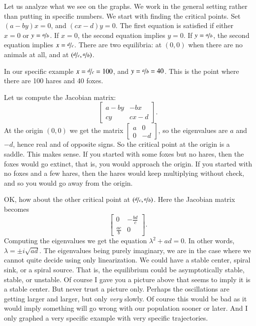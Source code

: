 \documentclass[12pt]{book}
\begin{document}
Let us analyze what we see on the graphs.  We work in the general
setting rather than putting in specific numbers.  We start with finding
the critical points.  Set $(a-by)x = 0$, and $(cx-d)y = 0$.
The first equation is satisfied if either $x=0$ or $y=\nicefrac{a}{b}$.  If $x=0$, the
second equation implies $y=0$.  If $y= \nicefrac{a}{b}$, the second equation implies
$x=\nicefrac{d}{c}$.
There are two equilibria: at $(0,0)$ when there are no animals at all, and at
$(\nicefrac{d}{c},\nicefrac{a}{b})$.  

In our specific example $x = \nicefrac{d}{c} = 100$, and $y = \nicefrac{a}{b} = 40$.
This is the point where there are 100 hares and 40 foxes.

Let us compute the Jacobian matrix:
\begin{equation*}
\begin{bmatrix}
a-by & -bx \\
cy & cx-d
\end{bmatrix} .
\end{equation*}
At the origin $(0,0)$ we get the matrix
$\left[ \begin{smallmatrix}
a & 0 \\
0 & -d
\end{smallmatrix} \right]$, so the eigenvalues are $a$ and $-d$, hence real
and of opposite signs.  So the critical point at the origin is a saddle.
This makes sense.  If you started with some foxes but no hares, then the
foxes would go extinct, that is, you would approach the origin.  If you
started with no foxes and a few hares, then the hares would keep multiplying
without check, and so you would go away from the origin.

OK, how about the other critical point at $(\nicefrac{d}{c},\nicefrac{a}{b})$.  Here
the Jacobian matrix becomes
\begin{equation*}
\begin{bmatrix}
0 & -\frac{bd}{c} \\
\frac{ac}{b} & 0
\end{bmatrix} .
\end{equation*}
Computing the eigenvalues we get the equation $\lambda^2 + ad = 0$.  In
other words, $\lambda = \pm i \sqrt{ad}$.  The eigenvalues being
purely imaginary, we are in the case where we cannot quite decide using only
linearization.  We could
have a stable center, spiral sink, or a spiral source.  That is, the
equilibrium could be asymptotically stable, stable, or unstable.  Of
course I gave you a picture above that seems to imply it is a stable
center.  But never trust a picture only.  Perhaps the oscillations
are getting larger and larger, but only \emph{very} slowly.  Of course this would be
bad as it would imply something will go wrong with our population
sooner or later.  And I only graphed a very specific example with very
specific trajectories.
\end{document}
